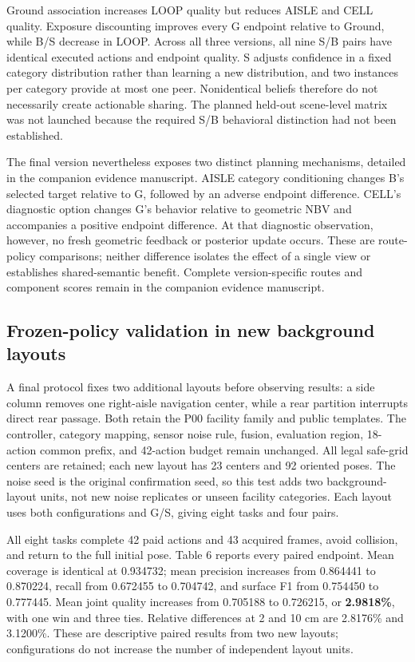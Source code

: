 \documentclass[11pt,a4paper]{article}
\begin{document}
Ground association increases LOOP quality but reduces AISLE and CELL quality. Exposure discounting improves every G endpoint relative to Ground, while B/S decrease in LOOP. Across all three versions, all nine S/B pairs have identical executed actions and endpoint quality. S adjusts confidence in a fixed category distribution rather than learning a new distribution, and two instances per category provide at most one peer. Nonidentical beliefs therefore do not necessarily create actionable sharing. The planned held-out scene-level matrix was not launched because the required S/B behavioral distinction had not been established.

The final version nevertheless exposes two distinct planning mechanisms, detailed in the companion evidence manuscript. AISLE category conditioning changes B's selected target relative to G, followed by an adverse endpoint difference. CELL's diagnostic option changes G's behavior relative to geometric NBV and accompanies a positive endpoint difference. At that diagnostic observation, however, no fresh geometric feedback or posterior update occurs. These are route-policy comparisons; neither difference isolates the effect of a single view or establishes shared-semantic benefit. Complete version-specific routes and component scores remain in the companion evidence manuscript.

\hypertarget{frozen-policy-validation-in-new-background-layouts}{%
\subsection{Frozen-policy validation in new background layouts}\label{frozen-policy-validation-in-new-background-layouts}}

A final protocol fixes two additional layouts before observing results: a side column removes one right-aisle navigation center, while a rear partition interrupts direct rear passage. Both retain the P00 facility family and public templates. The controller, category mapping, sensor noise rule, fusion, evaluation region, 18-action common prefix, and 42-action budget remain unchanged. All legal safe-grid centers are retained; each new layout has 23 centers and 92 oriented poses. The noise seed is the original confirmation seed, so this test adds two background-layout units, not new noise replicates or unseen facility categories. Each layout uses both configurations and G/S, giving eight tasks and four pairs.

All eight tasks complete 42 paid actions and 43 acquired frames, avoid collision, and return to the full initial pose. Table 6 reports every paired endpoint. Mean coverage is identical at 0.934732; mean precision increases from 0.864441 to 0.870224, recall from 0.672455 to 0.704742, and surface F1 from 0.754450 to 0.777445. Mean joint quality increases from 0.705188 to 0.726215, or \textbf{2.9818\%}, with one win and three ties. Relative differences at 2 and 10 cm are 2.8176\% and 3.1200\%. These are descriptive paired results from two new layouts; configurations do not increase the number of independent layout units.
\end{document}
